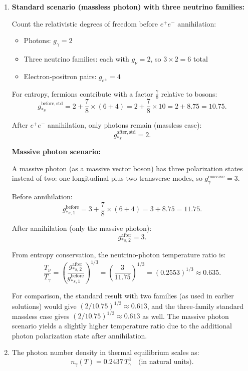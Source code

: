 \begin{enumerate}[label=(\alph*)]
  \item \textbf{Standard scenario (massless photon) with three neutrino families:}
  
  Count the relativistic degrees of freedom before $e^+e^-$ annihilation:
  \begin{itemize}
    \item Photons: $g_\gamma=2$
    \item Three neutrino families: each with $g_\nu=2$, so $3 \times 2 = 6$ total
    \item Electron-positron pairs: $g_{e^\pm}=4$
  \end{itemize}
  
  For entropy, fermions contribute with a factor $\frac{7}{8}$ relative to bosons:
  \[
    g_{*s}^{\mathrm{before,std}} = 2 + \frac{7}{8}\times(6+4) = 2 + \frac{7}{8}\times 10 = 2 + 8.75 = 10.75.
  \]
  
  After $e^+e^-$ annihilation, only photons remain (massless case):
  \[
    g_{*s}^{\mathrm{after,std}} = 2.
  \]
  
  \textbf{Massive photon scenario:}
  
  A massive photon (as a massive vector boson) has three polarization states instead of two: one longitudinal plus two transverse modes, so $g_\gamma^{\mathrm{massive}} = 3$.
  
  Before annihilation:
  \[
    g_{*s,1}^{\mathrm{before}} = 3 + \frac{7}{8}\times(6+4) = 3 + 8.75 = 11.75.
  \]
  
  After annihilation (only the massive photon):
  \[
    g_{*s,2}^{\mathrm{after}} = 3.
  \]
  
  From entropy conservation, the neutrino-photon temperature ratio is:
  \[
    \frac{T_\nu}{T_\gamma} = \left(\frac{g_{*s,2}^{\mathrm{after}}}{g_{*s,1}^{\mathrm{before}}}\right)^{1/3} = \left(\frac{3}{11.75}\right)^{1/3} = \left(0.2553\right)^{1/3} \approx 0.635.
  \]
  
  For comparison, the standard result with two families (as used in earlier solutions) would give $(2/10.75)^{1/3} \approx 0.613$, and the three-family standard massless case gives $(2/10.75)^{1/3} \approx 0.613$ as well. The massive photon scenario yields a slightly higher temperature ratio due to the additional photon polarization state after annihilation.

  \item The photon number density in thermal equilibrium scales as:
  \[
    n_\gamma(T) = 0.2437\, T_\gamma^3 \quad \text{(in natural units)}.
  \]
  

\end{enumerate}
